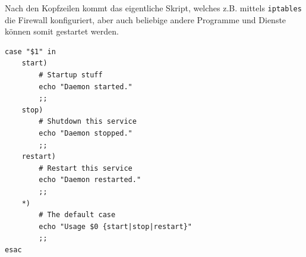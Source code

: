 Nach den Kopfzeilen kommt das eigentliche Skript, welches z.B. mittels
{\tt iptables} die Firewall konfiguriert, aber auch beliebige andere Programme
und Dienste können somit gestartet werden.

\begin{lstlisting}[label=lst:lsb-script,caption={Init Script LSB: Eigentliches Skript.}]
case "$1" in
    start)
        # Startup stuff
        echo "Daemon started."
        ;;
    stop)
        # Shutdown this service
        echo "Daemon stopped."
        ;;
    restart)
        # Restart this service
        echo "Daemon restarted."
        ;;
    *)
        # The default case
        echo "Usage $0 {start|stop|restart}"
        ;;
esac
\end{lstlisting}
